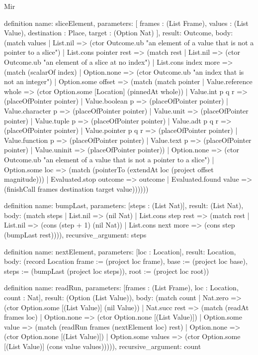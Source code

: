 \begin{lexlean}{Mir}
\begin{semanticmodule}
definition{
  name: sliceElement,
  parameters: [
    frames : (List Frame),
    values : (List Value),
    destination : Place,
    target : (Option Nat)
  ],
  result: Outcome,
  body: (match values
    | List.nil => (ctor Outcome.ub "an element of a value that is not a pointer to a slice")
    | List.cons pointer rest => (match rest
      | List.nil => (ctor Outcome.ub "an element of a slice at no index")
      | List.cons index more => (match (scalarOf index)
        | Option.none => (ctor Outcome.ub "an index that is not an integer")
        | Option.some offset => (match (match pointer
            | Value.reference whole => (ctor Option.some [Location] (pinnedAt whole))
            | Value.int p q r => (placeOfPointer pointer)
            | Value.boolean p => (placeOfPointer pointer)
            | Value.character p => (placeOfPointer pointer)
            | Value.unit => (placeOfPointer pointer)
            | Value.tuple p => (placeOfPointer pointer)
            | Value.adt p q r => (placeOfPointer pointer)
            | Value.pointer p q r => (placeOfPointer pointer)
            | Value.function p => (placeOfPointer pointer)
            | Value.text p => (placeOfPointer pointer)
            | Value.uninit => (placeOfPointer pointer))
          | Option.none => (ctor Outcome.ub "an element of a value that is not a pointer to a slice")
          | Option.some loc => (match (pointerTo (extendAt loc (project offset magnitude)))
            | Evaluated.stop outcome => outcome
            | Evaluated.found value => (finishCall frames destination target value))))))
}

definition{
  name: bumpLast,
  parameters: [steps : (List Nat)],
  result: (List Nat),
  body: (match steps
    | List.nil => (nil Nat)
    | List.cons step rest => (match rest
      | List.nil => (cons (step + 1) (nil Nat))
      | List.cons next more => (cons step (bumpLast rest)))),
  recursive_argument: steps
}

definition{
  name: nextElement,
  parameters: [loc : Location],
  result: Location,
  body: (record Location {frame := (project loc frame), base := (project loc base), steps := (bumpLast (project loc steps)), root := (project loc root)})
}

definition{
  name: readRun,
  parameters: [frames : (List Frame), loc : Location, count : Nat],
  result: (Option (List Value)),
  body: (match count
    | Nat.zero => (ctor Option.some [(List Value)] (nil Value))
    | Nat.succ rest => (match (readAt frames loc)
      | Option.none => (ctor Option.none [(List Value)])
      | Option.some value => (match (readRun frames (nextElement loc) rest)
        | Option.none => (ctor Option.none [(List Value)])
        | Option.some values => (ctor Option.some [(List Value)] (cons value values))))),
  recursive_argument: count
}


\end{semanticmodule}
\end{lexlean}
